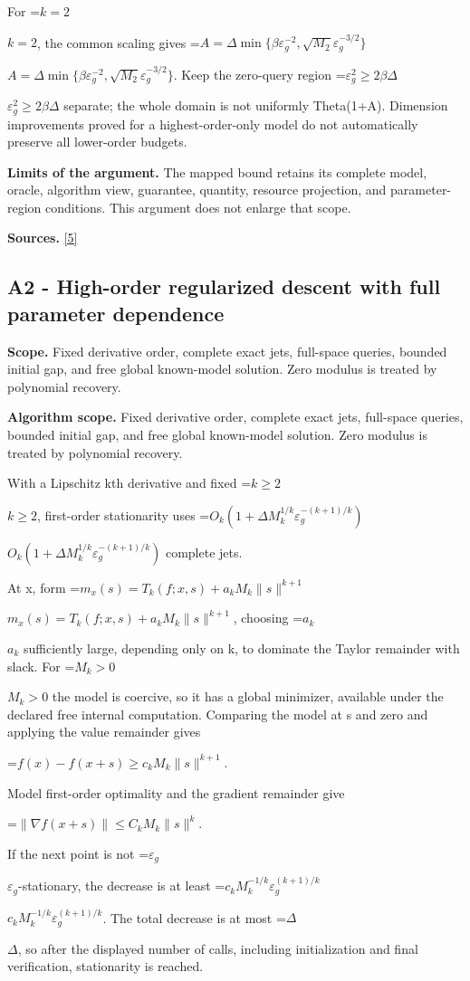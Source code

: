 \documentclass[10pt,a4paper]{article}
\newcommand{\AtlasMath}[1]{\par\begingroup\centering\setbox0=\hbox{$\displaystyle #1$}\ifdim\wd0>1.4\linewidth\typeout{ATLAS WIDE FORMULA: \the\wd0}\fi\ifdim\wd0>\linewidth\resizebox{\linewidth}{!}{\box0}\else\box0\fi\par\endgroup}
\newcommand{\AtlasInlineMath}[1]{\begingroup\setbox0=\hbox{$#1$}\ifdim\wd0>.4\linewidth\endgroup\AtlasMath{#1}\else\endgroup$#1$\fi}
\begin{document}
For \AtlasInlineMath{k=2}, the common scaling gives \AtlasInlineMath{A=\Delta\min\{\beta\varepsilon_g^{-2},\sqrt{M_2}\varepsilon_g^{-3/2}\}}. Keep the zero-query region \AtlasInlineMath{\varepsilon_g^2\ge2\beta\Delta} separate; the whole domain is not uniformly Theta(1+A). Dimension improvements proved for a highest-order-only model do not automatically preserve all lower-order budgets.

\textbf{Limits of the argument.} The mapped bound retains its complete model, oracle, algorithm view, guarantee, quantity, resource projection, and parameter-region conditions. This argument does not enlarge that scope.

\textbf{Sources.} \href{https://arxiv.org/abs/1710.11606v3}{[5]}

\subsection{A2 - High-order regularized descent with full parameter dependence}
\textbf{Scope.} Fixed derivative order, complete exact jets, full-space queries, bounded initial gap, and free global known-model solution. Zero modulus is treated by polynomial recovery.

\textbf{Algorithm scope.} Fixed derivative order, complete exact jets, full-space queries, bounded initial gap, and free global known-model solution. Zero modulus is treated by polynomial recovery.

With a Lipschitz kth derivative and fixed \AtlasInlineMath{k\ge2}, first-order stationarity uses \AtlasInlineMath{O_k(1+\Delta M_k^{1/k}\varepsilon_g^{-(k+1)/k})} complete jets.

At x, form \AtlasInlineMath{m_x(s)=T_k(f;x,s)+a_kM_k\|s\|^{k+1}}, choosing \AtlasInlineMath{a_k} sufficiently large, depending only on k, to dominate the Taylor remainder with slack. For \AtlasInlineMath{M_k>0} the model is coercive, so it has a global minimizer, available under the declared free internal computation. Comparing the model at s and zero and applying the value remainder gives

\AtlasMath{f(x)-f(x+s)\ge c_kM_k\|s\|^{k+1}.}

Model first-order optimality and the gradient remainder give

\AtlasMath{\|\nabla f(x+s)\|\le C_kM_k\|s\|^k.}

If the next point is not \AtlasInlineMath{\varepsilon_g}-stationary, the decrease is at least \AtlasInlineMath{c_kM_k^{-1/k}\varepsilon_g^{(k+1)/k}}. The total decrease is at most \AtlasInlineMath{\Delta}, so after the displayed number of calls, including initialization and final verification, stationarity is reached.
\end{document}
